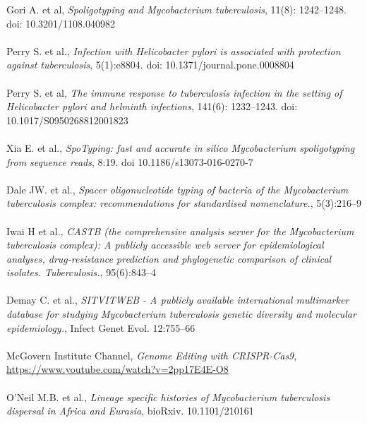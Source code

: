 \documentclass[twoside,a4paper,11pt,frenchb,openany]{report}
\begin{document}
\begin{spacing}{0.5}
\begin{thebibliography}{10}
Gori A. et al, \textit{Spoligotyping and Mycobacterium tuberculosis}, 11(8): 1242–1248. doi: 10.3201/1108.040982\\ \\

Perry S. et al., \textit{Infection with Helicobacter pylori is associated with protection against tuberculosis}, 5(1):e8804. doi: 10.1371/journal.pone.0008804\\ \\

Perry S. et al, \textit{The immune response to tuberculosis infection in the setting of Helicobacter pylori and helminth infections}, 141(6): 1232–1243. doi: 10.1017/S0950268812001823\\ \\

Xia E. et al., \textit{SpoTyping: fast and accurate in silico Mycobacterium spoligotyping from sequence reads}, 8:19. doi 10.1186/s13073-016-0270-7\\ \\ 

Dale JW. et al., \textit{Spacer oligonucleotide typing of bacteria of the Mycobacterium tuberculosis complex: recommendations for standardised nomenclature.}, 5(3):216–9\\ \\

Iwai H et al., \textit{CASTB (the comprehensive analysis server for the Mycobacterium tuberculosis complex): A publicly accessible web server for epidemiological analyses, drug-resistance prediction and phylogenetic comparison of clinical isolates. Tuberculosis.}, 95(6):843–4\\ \\

Demay C. et al., \textit{SITVITWEB - A publicly available international multimarker database for studying Mycobacterium tuberculosis genetic diversity and molecular epidemiology.}, Infect Genet Evol. 12:755–66\\ \\

\bibitem{}McGovern Institute Channel, \textit{Genome Editing with CRISPR-Cas9}, \url{https://www.youtube.com/watch?v=2pp17E4E-O8}\\ \\

O'Neil M.B. et al., \textit{Lineage specific histories of Mycobacterium tuberculosis dispersal in Africa and Eurasia}, bioRxiv. 10.1101/210161\\ \\


\end{thebibliography}
\end{spacing}
\end{document}
